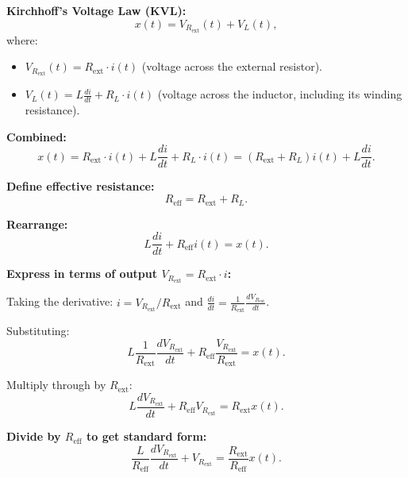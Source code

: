 \documentclass[11pt,letterpaper]{article}
\begin{document}
\textbf{Kirchhoff's Voltage Law (KVL):}
\begin{equation}
x(t) = V_{R_{\text{ext}}}(t) + V_L(t),
\end{equation}
where:
\begin{itemize}
    \item $V_{R_{\text{ext}}}(t) = R_{\text{ext}} \cdot i(t)$ (voltage across the external resistor).
    \item $V_L(t) = L \frac{di}{dt} + R_L \cdot i(t)$ (voltage across the inductor, including its winding resistance).
\end{itemize}

\noindent
\textbf{Combined:}
\begin{equation}
x(t) = R_{\text{ext}} \cdot i(t) + L \frac{di}{dt} + R_L \cdot i(t) = (R_{\text{ext}} + R_L) i(t) + L \frac{di}{dt}.
\end{equation}

\noindent
\textbf{Define effective resistance:}
\begin{equation}
R_{\text{eff}} = R_{\text{ext}} + R_L.
\end{equation}

\noindent
\textbf{Rearrange:}
\begin{equation}
L \frac{di}{dt} + R_{\text{eff}} i(t) = x(t).
\end{equation}

\noindent
\textbf{Express in terms of output $V_{R_{\text{ext}}} = R_{\text{ext}} \cdot i$:}

Taking the derivative: $i = V_{R_{\text{ext}}} / R_{\text{ext}}$ and $\frac{di}{dt} = \frac{1}{R_{\text{ext}}} \frac{dV_{R_{\text{ext}}}}{dt}$.

\noindent
Substituting:
\begin{equation}
L \frac{1}{R_{\text{ext}}} \frac{dV_{R_{\text{ext}}}}{dt} + R_{\text{eff}} \frac{V_{R_{\text{ext}}}}{R_{\text{ext}}} = x(t).
\end{equation}

\noindent
Multiply through by $R_{\text{ext}}$:
\begin{equation}
L \frac{dV_{R_{\text{ext}}}}{dt} + R_{\text{eff}} V_{R_{\text{ext}}} = R_{\text{ext}} x(t).
\end{equation}

\noindent
\textbf{Divide by $R_{\text{eff}}$ to get standard form:}
\begin{equation}
\frac{L}{R_{\text{eff}}} \frac{dV_{R_{\text{ext}}}}{dt} + V_{R_{\text{ext}}} = \frac{R_{\text{ext}}}{R_{\text{eff}}} x(t).
\end{equation}
\end{document}
